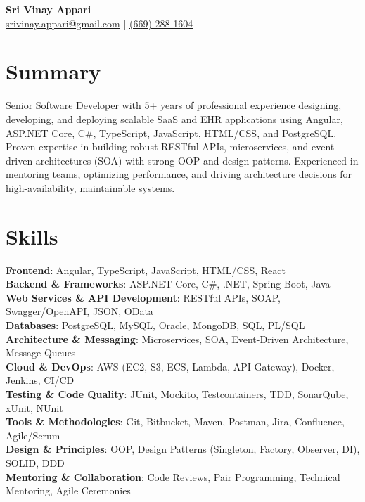 \documentclass{resume}
\begin{document}
\begin{center}
    {\Huge \textbf{Sri Vinay Appari}}\\[4pt]
    \small
    \href{mailto:srivinay.appari@gmail.com}{srivinay.appari@gmail.com} $|$
    \href{tel:(669) 288-1604}{(669) 288-1604}
\end{center}

\section{Summary}
\begin{itemize}[leftmargin=0pt, itemindent=0pt, labelwidth=0pt, labelsep=0pt, align=left, label={}]%
  \small{\item{
    Senior Software Developer with 5+ years of professional experience designing, developing, and deploying scalable SaaS and EHR applications using Angular, ASP.NET Core, C\#, TypeScript, JavaScript, HTML/CSS, and PostgreSQL. Proven expertise in building robust RESTful APIs, microservices, and event-driven architectures (SOA) with strong OOP and design patterns. Experienced in mentoring teams, optimizing performance, and driving architecture decisions for high-availability, maintainable systems.
  }}
\end{itemize}

\section{Skills}
\begin{itemize}[leftmargin=0pt, itemindent=0pt, labelwidth=0pt, labelsep=0pt, align=left, label={}]%
  \small{\item{
    \textbf{Frontend}{: Angular, TypeScript, JavaScript, HTML/CSS, React} \\
    \textbf{Backend \& Frameworks}{: ASP.NET Core, C\#, .NET, Spring Boot, Java} \\
    \textbf{Web Services \& API Development}{: RESTful APIs, SOAP, Swagger/OpenAPI, JSON, OData} \\
    \textbf{Databases}{: PostgreSQL, MySQL, Oracle, MongoDB, SQL, PL/SQL} \\
    \textbf{Architecture \& Messaging}{: Microservices, SOA, Event-Driven Architecture, Message Queues} \\
    \textbf{Cloud \& DevOps}{: AWS (EC2, S3, ECS, Lambda, API Gateway), Docker, Jenkins, CI/CD} \\
    \textbf{Testing \& Code Quality}{: JUnit, Mockito, Testcontainers, TDD, SonarQube, xUnit, NUnit} \\
    \textbf{Tools \& Methodologies}{: Git, Bitbucket, Maven, Postman, Jira, Confluence, Agile/Scrum} \\
    \textbf{Design \& Principles}{: OOP, Design Patterns (Singleton, Factory, Observer, DI), SOLID, DDD} \\
    \textbf{Mentoring \& Collaboration}{: Code Reviews, Pair Programming, Technical Mentoring, Agile Ceremonies}
  }}
\end{itemize}
\end{document}
